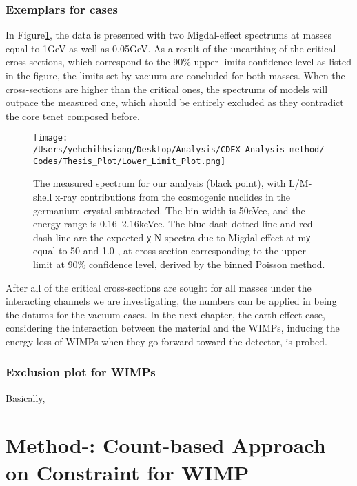 \subsection{Exemplars for cases}
 In Figure\ref{Vacuum-constrained WIMPs}, the data is presented with two Migdal-effect spectrums at masses equal to 1GeV as well as 0.05GeV. As a result of the unearthing of the critical cross-sections, which correspond to the 90\% upper limits confidence level as listed in the figure, the limits set by vacuum are concluded for both masses. When the cross-sections are higher than the critical ones, the spectrums of models will outpace the measured one, which should be entirely excluded as they contradict the core tenet composed before. \\ 
    \begin{figure}[h]
    \texttt{[image: /Users/yehchihhsiang/Desktop/Analysis/CDEX\_Analysis\_method/Codes/Thesis\_Plot/Lower\_Limit\_Plot.png]}
    \centering
    \caption{The measured spectrum for our analysis (black point), with L/M-shell x-ray contributions from the cosmogenic nuclides in the germanium crystal subtracted. The bin width is 50eVee, and the energy range is 0.16–2.16keVee. The blue dash-dotted line and red dash line are the expected χ-N spectra due to Migdal effect at mχ equal to 50  and 1.0  , at cross-section corresponding to the upper limit at 90\% confidence level, derived by the binned Poisson method.} \label{Vacuum-constrained WIMPs}
    \end{figure}
  
After all of the critical cross-sections are sought for all masses under the interacting channels we are investigating, the numbers can be applied in being the datums for the vacuum cases. In the next chapter, the earth effect case, considering the interaction between the material and the WIMPs, inducing the energy loss of WIMPs when they go forward toward the detector, is probed.\\

\subsection{Exclusion plot for WIMPs}
Basically, 

\chapter{Method-: Count-based Approach on Constraint for WIMP}


